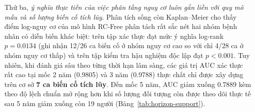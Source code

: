 Thứ ba, \emph{ý nghĩa thực tiễn của việc phân tầng nguy cơ luôn gắn liền với quy mô mẫu và số lượng biến cố tích lũy}. Phân tích sống còn Kaplan--Meier cho thấy điểm log-nguy cơ của mô hình RC-Free phân tách rất sắc nét hai nhóm bệnh nhân có diễn biến khác biệt: trên tập xác thực đạt mức ý nghĩa log-rank $p=0.0134$ (ghi nhận 12/26 ca biến cố ở nhóm nguy cơ cao so với chỉ 4/28 ca ở nhóm nguy cơ thấp) và trên tập kiểm tra hậu nghiệm độc lập đạt $p<0.001$. Tuy nhiên, khi đánh giá sâu theo từng thời hạn lâm sàng, các giá trị AUC xác thực rất cao tại mốc 2 năm (0.9805) và 3 năm (0.9788) thực chất chỉ được xây dựng trên cơ sở \textbf{7 ca biến cố tích lũy}. Đến mốc 5 năm, AUC giảm xuống 0.7889 kèm theo độ lệch chuẩn mở rộng hơn khi số lượng đối tượng còn được theo dõi thực tế sau 5 năm giảm xuống còn 19 người (Bảng~\ref{tab:horizon-support}).

